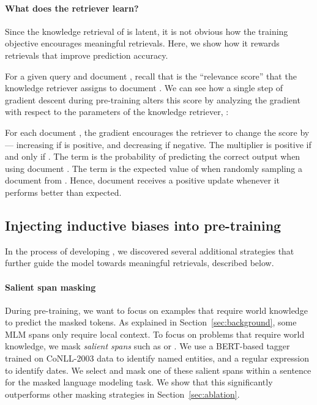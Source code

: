 \documentclass{article}
\begin{document}
\paragraph{What does the retriever learn?}
Since the knowledge retrieval of \thename is latent, it is not obvious how the training objective encourages meaningful retrievals. Here, we show how it rewards retrievals that improve prediction accuracy.

For a given query  and document , recall that 
is the ``relevance score'' that the knowledge retriever assigns to document .
We can see how a single step of gradient descent during \thename pre-training alters this score by analyzing
the gradient with respect to the parameters of the knowledge retriever, :

For each document , the gradient encourages
the retriever to change the score  by  --- 
increasing if  is positive, and decreasing if negative.
The multiplier 
is positive if and only if .
The term  is the probability of predicting
the correct output  when using document .
The term  is the expected value of  when randomly sampling a document from . Hence, document  receives a positive update whenever it performs better than expected.


\subsection{Injecting inductive biases into pre-training} \label{sec:inductive-bias}
In the process of developing \thename, we discovered several additional strategies that further guide the model towards meaningful retrievals, described below.

\paragraph{Salient span masking}
During \thename pre-training, we want to focus on examples  that require world knowledge to predict the masked tokens. As explained in Section~\ref{sec:background}, some MLM spans only require local context. To focus on problems that require world knowledge, we mask \emph{salient spans} such as  or . We use a BERT-based tagger trained on CoNLL-2003 data \cite{conll_ner} to identify named entities, and a regular expression to identify dates. We select and mask one of these salient spans within a sentence for the masked language modeling task. We show that this significantly outperforms other masking strategies in Section~\ref{sec:ablation}.
\end{document}

